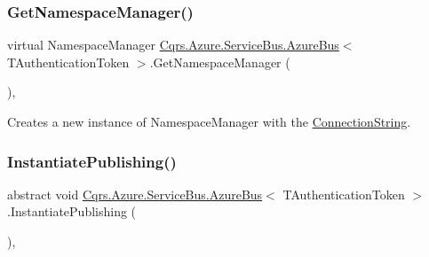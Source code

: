 \mbox{\label{classCqrs_1_1Azure_1_1ServiceBus_1_1AzureBus_ae7e6f920864cceec2850be9baac84803_ae7e6f920864cceec2850be9baac84803}} 
\subsubsection{\texorpdfstring{Get\+Namespace\+Manager()}{GetNamespaceManager()}}
{\footnotesize\ttfamily virtual Namespace\+Manager \hyperlink{classCqrs_1_1Azure_1_1ServiceBus_1_1AzureBus}{Cqrs.\+Azure.\+Service\+Bus.\+Azure\+Bus}$<$ T\+Authentication\+Token $>$.Get\+Namespace\+Manager (\begin{DoxyParamCaption}{ }\end{DoxyParamCaption})\hspace{0.3cm}{\ttfamily [protected]}, {\ttfamily [virtual]}}



Creates a new instance of Namespace\+Manager with the \hyperlink{classCqrs_1_1Azure_1_1ServiceBus_1_1AzureBus_aaccdbc8cd25d3ae4f1a2801d2ad02a96_aaccdbc8cd25d3ae4f1a2801d2ad02a96}{Connection\+String}. 

\mbox{\label{classCqrs_1_1Azure_1_1ServiceBus_1_1AzureBus_a0bacaa4619921333da4a27371c1d6d0a_a0bacaa4619921333da4a27371c1d6d0a}} 
\subsubsection{\texorpdfstring{Instantiate\+Publishing()}{InstantiatePublishing()}}
{\footnotesize\ttfamily abstract void \hyperlink{classCqrs_1_1Azure_1_1ServiceBus_1_1AzureBus}{Cqrs.\+Azure.\+Service\+Bus.\+Azure\+Bus}$<$ T\+Authentication\+Token $>$.Instantiate\+Publishing (\begin{DoxyParamCaption}{ }\end{DoxyParamCaption})\hspace{0.3cm}{\ttfamily [protected]}, {}}



